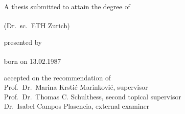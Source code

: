 \begin{titlepage}
    \begin{center}
        \large
        \begingroup
        \endgroup

        \hfill

        \vfill

        \begingroup
            \spacedallcaps{\myTitle}
        \endgroup

        \vfill

        \begingroup
            A thesis submitted to attain the degree of \\ %
            \vspace{1em}
             \\
            (Dr.\ sc.\ ETH Zurich)
        \endgroup

        \vfill

        \begingroup
            presented by\\
            \vspace{2.5em}
            \spacedlowsmallcaps{\myName} \\
            \vspace{2.5em}
            born on 13.02.1987 %
        \endgroup

        \vfill

        \begingroup
            accepted on the recommendation of \\
            \vspace{1em}
            Prof.\ Dr.\ Marina Krstić Marinković, supervisor \\
            Prof.\ Dr.\ Thomas C. Schulthess, second topical supervisor \\
            Dr.\ Isabel Campos Plasencia, external examiner \\
        \endgroup

        \vfill

        \myTime%

        \vfill
    \end{center}
\end{titlepage}

